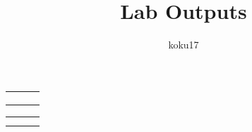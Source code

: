 \documentclass{article}
\title{Lab Outputs}
\author{koku17}
\begin{document}
	\maketitle {} \newpage
	\begin{landscape}
	\begin{table}
		\centering
		\begin{tabular}{lll}
			 &
			 &
			 \\
			 &
			 &
			 \\
			 &
			 &
		\end{tabular}
	\end{table}

	\begin{table}
		\centering
		\begin{tabular}{lll}
			 &
			 &
			 \\
			 &
			 &
			 \\
			
		\end{tabular}
	\end{table}
	\end{landscape}
\end{document}
